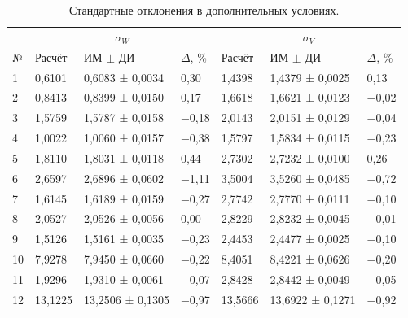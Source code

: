 \documentclass[a4paper,12pt]{article}
\begin{document}
\begin{table}[!htbp]
\centering\small\setlength{\tabcolsep}{2pt}
\begin{tabular}{@{}p{1.5cm}p{1.9cm}p{3.4cm}p{1.4cm}p{1.9cm}p{3.4cm}p{1.4cm}@{}}
\toprule
 & \multicolumn{3}{c}{$\sigma_W$} & \multicolumn{3}{c}{$\sigma_V$} \\
№ & Расчёт & ИМ $\pm$ ДИ & $\Delta$, \% & Расчёт & ИМ $\pm$ ДИ & $\Delta$, \% \\
\midrule
1 & 0,6101 & 0,6083 ± 0,0034 & 0,30 & 1,4398 & 1,4379 ± 0,0025 & 0,13 \\
2 & 0,8413 & 0,8399 ± 0,0150 & 0,17 & 1,6618 & 1,6621 ± 0,0123 & −0,02 \\
3 & 1,5759 & 1,5787 ± 0,0158 & −0,18 & 2,0143 & 2,0151 ± 0,0129 & −0,04 \\
4 & 1,0022 & 1,0060 ± 0,0157 & −0,38 & 1,5797 & 1,5834 ± 0,0115 & −0,23 \\
5 & 1,8110 & 1,8031 ± 0,0118 & 0,44 & 2,7302 & 2,7232 ± 0,0100 & 0,26 \\
6 & 2,6597 & 2,6896 ± 0,0602 & −1,11 & 3,5004 & 3,5260 ± 0,0485 & −0,72 \\
7 & 1,6145 & 1,6189 ± 0,0159 & −0,27 & 2,7742 & 2,7770 ± 0,0111 & −0,10 \\
8 & 2,0527 & 2,0526 ± 0,0056 & 0,00 & 2,8229 & 2,8232 ± 0,0045 & −0,01 \\
9 & 1,5126 & 1,5161 ± 0,0035 & −0,23 & 2,4453 & 2,4477 ± 0,0025 & −0,10 \\
10 & 7,9278 & 7,9450 ± 0,0660 & −0,22 & 8,4051 & 8,4221 ± 0,0626 & −0,20 \\
11 & 1,9296 & 1,9310 ± 0,0061 & −0,07 & 2,8428 & 2,8442 ± 0,0049 & −0,05 \\
12 & 13,1225 & 13,2506 ± 0,1305 & −0,97 & 13,5666 & 13,6922 ± 0,1271 & −0,92 \\
\bottomrule
\end{tabular}
\caption{Стандартные отклонения в дополнительных условиях.}
\label{tab:studystd}
\end{table}
\end{document}
